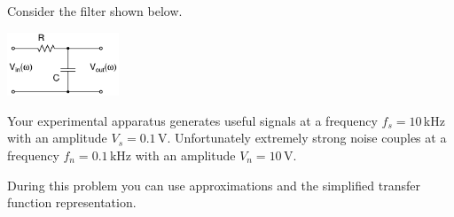 \documentclass[letterpaper,addpoints,answers]{exam}
\begin{document}
\begin{questions}
 
\pagebreak

\question

Consider the filter shown below.
\begin{center}
 \includegraphics[width=0.25\textwidth]{./schematics/rc_low_pass}
\end{center}


\pagebreak

\question

Your experimental apparatus generates useful signals at a frequency $f_s = 10$\,kHz 
with an amplitude $V_s = 0.1$\,V.  Unfortunately extremely strong noise couples
at a frequency $f_n = 0.1$\,kHz with an amplitude $V_n = 10$\,V.

During this problem you can use approximations and the simplified transfer
function representation.

\begin{parts}

\end{parts}
\end{questions}
\end{document}
